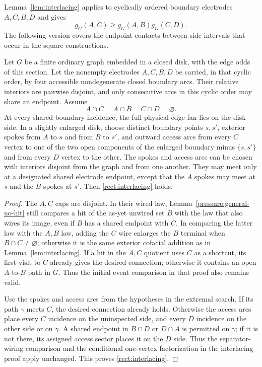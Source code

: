 Lemma~\ref{lem:interlacing} applies to cyclically ordered boundary
electrodes $A,C,B,D$ and gives
\begin{equation}
 g_G(A,C)\ge g_G(A,B)g_G(C,D).
 \label{rect:interlacing}
\end{equation}
The following version covers the endpoint contacts between side intervals
that occur in the square constructions.

\begin{corollary}
\label{rect:interlacing-abutments}
Let $G$ be a finite ordinary graph embedded in a closed disk, with the
edge odds of this section. Let the nonempty electrodes $A,C,B,D$ be
carried, in that cyclic order, by four accessible nondegenerate closed
boundary arcs.
Their relative interiors are pairwise disjoint, and only consecutive
arcs in this cyclic order may share an endpoint. Assume
\[
 A\cap C=A\cap B=C\cap D=\varnothing.
\]
At every shared boundary incidence, the full physical-edge fan lies
on the disk side. In a slightly enlarged disk, choose distinct boundary
points $s,s'$, exterior spokes from $A$ to $s$ and from $B$ to $s'$,
and outward access arcs from every $C$ vertex to one of the two open
components of the enlarged boundary minus $\{s,s'\}$ and from every
$D$ vertex to the other. The spokes and access arcs can be chosen with
interiors disjoint from the graph and from one another. They may meet
only at a designated shared electrode endpoint, except that the $A$
spokes may meet at $s$ and the $B$ spokes at $s'$. Then
\eqref{rect:interlacing} holds.
\end{corollary}

\begin{proof}
The $A,C$ caps are disjoint. In their wired law,
Lemma~\ref{pressure:general-no-hit} still compares a hit of the
as-yet unwired set $B$ with the law that also wires its image, even if
$B$ has a shared endpoint with $C$. In comparing the latter law with
the $A,B$ law, adding the $C$ wire enlarges the $B$ terminal when
$B\cap C\ne\varnothing$; otherwise it is the same exterior cofacial
addition as in Lemma~\ref{lem:interlacing}.
If a hit in the $A,C$ quotient uses $C$ as a shortcut, its first visit
to $C$ already gives the desired connection; otherwise it contains an
open $A$-to-$B$ path in $G$. Thus the initial event comparison in that
proof also remains valid.

Use the spokes and access arcs from the hypotheses in the extremal
search. If its path $\gamma$ meets $C$, the desired connection already
holds. Otherwise the access arcs place every $C$ incidence on the
uninspected side, and every $D$ incidence on the other side or on
$\gamma$. A shared endpoint in $B\cap D$ or $D\cap A$ is permitted
on $\gamma$; if it is not there, its assigned access sector places it
on the $D$ side. Thus the separator-wiring comparison and the
conditional one-vertex factorization in the interlacing proof apply
unchanged. This proves \eqref{rect:interlacing}.
\end{proof}

